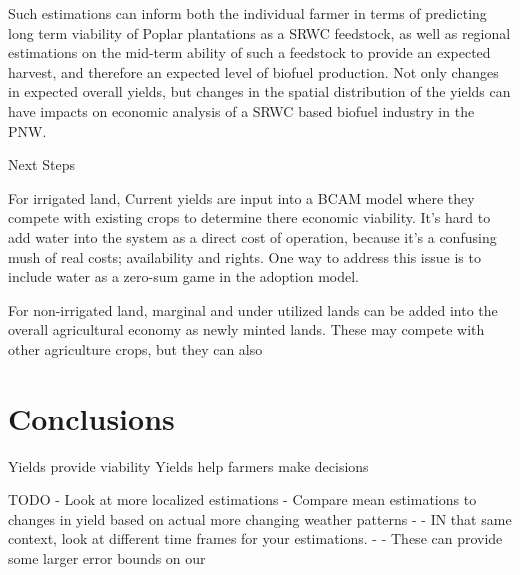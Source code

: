 \documentclass[preprint,12pt]{elsarticle}
\begin{document}
Such estimations can inform both the individual farmer in terms of
predicting long term viability of Poplar plantations as a \ac{SRWC}
feedstock, as well as regional estimations on the mid-term ability of
such a feedstock to provide an expected harvest, and therefore an
expected level of biofuel production.  Not only changes in expected
overall yields, but changes in the spatial distribution of the yields
can have impacts on economic analysis of a \ac{SRWC} based biofuel
industry in the \ac{PNW}.  

Next Steps 

For irrigated land, Current yields are input into a \ac{BCAM} model
where they compete with existing crops to determine there economic
viability.  It's hard to add water into the system as a direct cost of
operation, because it's a confusing mush of real costs; availability
and rights.  One way to address this issue is to include water as a
zero-sum game in the adoption model.

For non-irrigated land, marginal and under utilized lands can be
added into the overall agricultural economy as newly minted lands.
These may compete with other agriculture crops, but they can also 

\section{Conclusions}
\label{sec:conclude}

Yields provide viability
Yields help farmers make decisions

TODO
- Look at more localized estimations
- Compare mean estimations to changes in yield based on actual more changing weather patterns
- - IN that same context, look at different time frames for your estimations. 
- - These can provide some larger error bounds on our 




 






\end{document}
